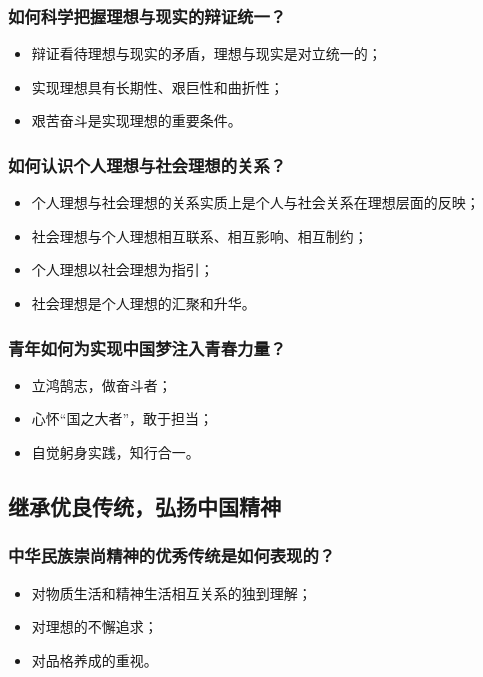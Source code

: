 \documentclass{article}
\begin{document}
\subsubsection{如何科学把握理想与现实的辩证统一？}
\begin{itemize}
    \item 辩证看待理想与现实的矛盾，理想与现实是对立统一的；
    \item 实现理想具有长期性、艰巨性和曲折性；
    \item 艰苦奋斗是实现理想的重要条件。
\end{itemize}

\subsubsection{如何认识个人理想与社会理想的关系？}
\begin{itemize}
    \item 个人理想与社会理想的关系实质上是个人与社会关系在理想层面的反映；
    \item 社会理想与个人理想相互联系、相互影响、相互制约；
    \item 个人理想以社会理想为指引；
    \item 社会理想是个人理想的汇聚和升华。
\end{itemize}

\subsubsection{青年如何为实现中国梦注入青春力量？}
\begin{itemize}
    \item 立鸿鹄志，做奋斗者；
    \item 心怀“国之大者”，敢于担当；
    \item 自觉躬身实践，知行合一。
\end{itemize}

\subsection{继承优良传统，弘扬中国精神}

\subsubsection{中华民族崇尚精神的优秀传统是如何表现的？}
\begin{itemize}
    \item 对物质生活和精神生活相互关系的独到理解；
    \item 对理想的不懈追求；
    \item 对品格养成的重视。
\end{itemize}
\end{document}
